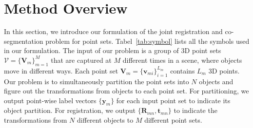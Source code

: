 \section{Method Overview}
\label{sec:method}
In this section, we introduce our formulation of the joint registration and co-segmentation problem for point sets. Tabel~\ref{tab:symbol} lists all the symbols used in our formulation. The input of our problem is a group of 3D point sets  $\mathcal{V}=\{\mathbf{V}_m\}^{M}_{m=1}$ that are captured at $M$ different times in a scene, where objects move in different ways. Each point set $\mathbf{V}_m=\{\pmb{v}_{mi}\}^{L_m}_{i=1}$ contains $L_m$ 3D points. Our problem is to simultaneously partition the point sets into $N$ objects and figure out the transformations from objects to each point set. For partitioning, we output point-wise label vectors $\{\pmb{y}_m\}$ for each input point set to indicate its object partition. For registration, we output $\{\mathbf{R}_{mn},\pmb{t}_{mn}\}$ to indicate the transformations from $N$ different objects to $M$ different point sets.
